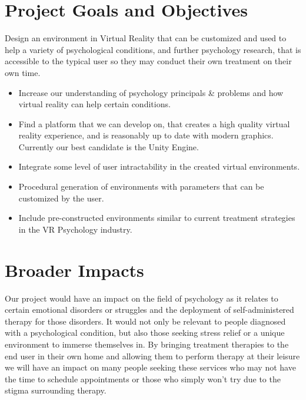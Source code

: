 \documentclass[a4paper,10pt]{article}
\begin{document}
\section{Project Goals and Objectives}
	Design an environment in Virtual Reality that can be customized and used to help a variety of psychological conditions, and further psychology research, that is accessible to the typical user so they may conduct their own treatment on their own time.
	\begin{itemize}
		\item Increase our understanding of psychology principals \& problems and how virtual reality can help certain conditions.
		\item Find a platform that we can develop on, that creates a high quality virtual reality experience, and is reasonably up to date with modern graphics. Currently our best candidate is the Unity Engine.
		\item Integrate some level of user intractability in the created virtual environments. 
		\item Procedural generation of environments with parameters that can be customized by the user. 
		\item Include pre-constructed environments similar to current treatment strategies in the VR Psychology industry.
	\end{itemize}
	\section{Broader Impacts}
	
	
	Our project would have an impact on the field of psychology as it relates to certain emotional disorders or struggles and the deployment of self-administered therapy for those disorders. It would not only be relevant to people diagnosed with a psychological condition, but also those seeking stress relief or a unique environment to immerse themselves in. By bringing treatment therapies to the end user in their own home and allowing them to perform therapy at their leisure we will have an impact on many people seeking these services who may not have the time to schedule appointments or those who simply won't try due to the stigma surrounding therapy.
	
\end{document}
